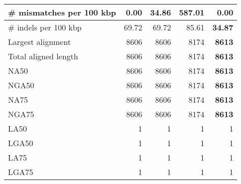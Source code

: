\documentclass[12pt,a4paper]{article}
\begin{document}
\begin{table}[ht]
\begin{center}
\begin{tabular}{|l*{4}{|r}|}
\# mismatches per 100 kbp & {\bf 0.00} & 34.86 & 587.01 & {\bf 0.00} \\ \hline
\# indels per 100 kbp & 69.72 & 69.72 & 85.61 & {\bf 34.87} \\ \hline
Largest alignment & 8606 & 8606 & 8174 & {\bf 8613} \\ \hline
Total aligned length & 8606 & 8606 & 8174 & {\bf 8613} \\ \hline
NA50 & 8606 & 8606 & 8174 & {\bf 8613} \\ \hline
NGA50 & 8606 & 8606 & 8174 & {\bf 8613} \\ \hline
NA75 & 8606 & 8606 & 8174 & {\bf 8613} \\ \hline
NGA75 & 8606 & 8606 & 8174 & {\bf 8613} \\ \hline
LA50 & 1 & 1 & 1 & 1 \\ \hline
LGA50 & 1 & 1 & 1 & 1 \\ \hline
LA75 & 1 & 1 & 1 & 1 \\ \hline
LGA75 & 1 & 1 & 1 & 1 \\ \hline
\end{tabular}
\end{center}
\end{table}
\end{document}
